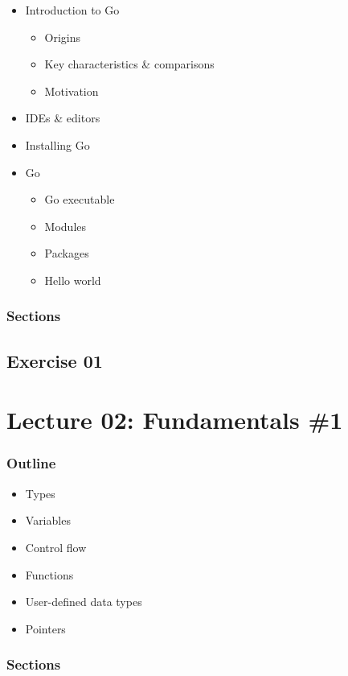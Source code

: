 \documentclass[
  digital,
  color,
  oneside,
  nosansbold,
  nocolorbold,
  lof,
  lot,
]{fithesis4}
\begin{document}
\begin{itemize}
    \item Introduction to Go
    \begin{itemize}
        \item Origins
        \item Key characteristics \& comparisons
        \item Motivation
    \end{itemize}
    \item IDEs \& editors
    \item Installing Go
    \item Go
    \begin{itemize}
        \item Go executable
        \item Modules
        \item Packages
        \item Hello world
    \end{itemize}
\end{itemize}

\subsubsection{Sections}

\subsection{Exercise 01}

\section{Lecture 02: Fundamentals \#1}

\subsubsection{Outline}

\begin{itemize}
    \item Types
    \item Variables
    \item Control flow
    \item Functions
    \item User-defined data types
    \item Pointers
\end{itemize}

\subsubsection{Sections}
\end{document}
